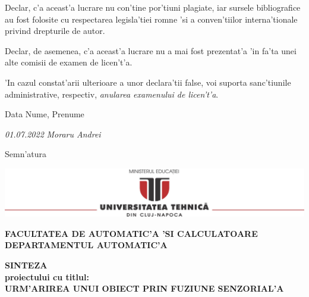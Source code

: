 \documentclass[12pt,a4paper,twoside]{report}
\renewcommand{\thesistitle}{URM'ARIREA UNUI OBIECT PRIN FUZIUNE SENZORIAL'A} %
\newcommand{\department}{FACULTATEA DE AUTOMATIC'A 'SI CALCULATOARE\\
DEPARTAMENTUL AUTOMATIC'A}
\newcommand{\utcnlogo}{\includegraphics[width=15cm]{img/utcn.jpg}}
\begin{document}
Declar, c'a aceast'a lucrare nu con'tine por'tiuni plagiate, iar sursele bibliografice au fost folosite cu respectarea legisla'tiei rom\ia ne 'si a conven'tiilor interna'tionale privind drepturile de autor.

Declar, de asemenea, c'a aceast'a lucrare nu a mai fost prezentat'a 'in fa'ta unei alte comisii de examen de licen't'a.

'In cazul constat'arii ulterioare a unor declara'tii false, voi suporta sanc'tiunile administrative, respectiv, \emph{anularea examenului de licen't'a}.

\vspace{1.5cm}

Data \hspace{8cm} Nume, Prenume

\vspace{0.5cm}

\textit{01.07.2022} \hspace{6.9cm} \textit{Moraru Andrei}

\vspace{1cm}
\hspace{9.4cm}Semn'atura

\thispagestyle{empty}


\newpage

\begin{center}
\utcnlogo

{\bf \department}
\end{center}

\vspace{0.5cm}

\begin{center}
{\bf
SINTEZA \\
proiectului cu titlul:} \\
{\bf \thesistitle}
\end{center}
\vspace{1cm}
\end{document}
